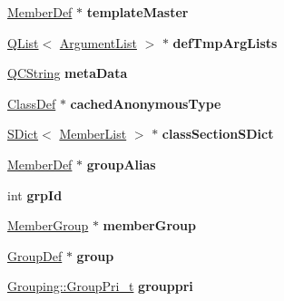 \begin{DoxyCompactItemize}
\mbox{\hyperlink{class_member_def}{Member\+Def}} $\ast$ {\bfseries template\+Master}
\item 
\mbox{\label{class_member_def_impl_a4d00872de77e13c3b707b4a8db704aad}} 
\mbox{\hyperlink{class_q_list}{Q\+List}}$<$ \mbox{\hyperlink{class_argument_list}{Argument\+List}} $>$ $\ast$ {\bfseries def\+Tmp\+Arg\+Lists}
\item 
\mbox{\label{class_member_def_impl_ac9073d068ee5bbc2bcbb16d07b029422}} 
\mbox{\hyperlink{class_q_c_string}{Q\+C\+String}} {\bfseries meta\+Data}
\item 
\mbox{\label{class_member_def_impl_a288b263aa2d14e016ab6f930816fad9d}} 
\mbox{\hyperlink{class_class_def}{Class\+Def}} $\ast$ {\bfseries cached\+Anonymous\+Type}
\item 
\mbox{\label{class_member_def_impl_af5ddb8894600c2e9d2d05b8803f64e6e}} 
\mbox{\hyperlink{class_s_dict}{S\+Dict}}$<$ \mbox{\hyperlink{class_member_list}{Member\+List}} $>$ $\ast$ {\bfseries class\+Section\+S\+Dict}
\item 
\mbox{\label{class_member_def_impl_ab0c6a9476261e8bf1959262956c6b65b}} 
\mbox{\hyperlink{class_member_def}{Member\+Def}} $\ast$ {\bfseries group\+Alias}
\item 
\mbox{\label{class_member_def_impl_a784d7ffa09c8f22d758a47ea730d4d9b}} 
int {\bfseries grp\+Id}
\item 
\mbox{\label{class_member_def_impl_a089e0d4f9153d6cd4afe947384961ad2}} 
\mbox{\hyperlink{class_member_group}{Member\+Group}} $\ast$ {\bfseries member\+Group}
\item 
\mbox{\label{class_member_def_impl_ab2f2ad83fac6686d918ebc1607eb0564}} 
\mbox{\hyperlink{class_group_def}{Group\+Def}} $\ast$ {\bfseries group}
\item 
\mbox{\label{class_member_def_impl_a422172e0211764448dde35c75f8bee06}} 
\mbox{\hyperlink{struct_grouping_a9f0ec5ab376b083ebe3274ea79fd2d70}{Grouping\+::\+Group\+Pri\+\_\+t}} {\bfseries grouppri}

\end{DoxyCompactItemize}
